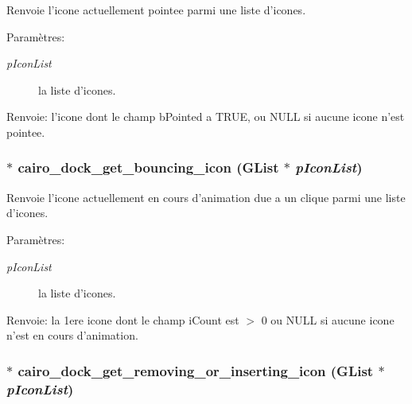 Renvoie l'icone actuellement pointee parmi une liste d'icones. \begin{Desc}
\item[Paramètres:]
\begin{description}
\item[{\em pIconList}]la liste d'icones. \end{description}
\end{Desc}
\begin{Desc}
\item[Renvoie:]l'icone dont le champ bPointed a TRUE, ou NULL si aucune icone n'est pointee. \end{Desc}
\subsubsection{$\ast$ cairo\_\-dock\_\-get\_\-bouncing\_\-icon (GList $\ast$ {\em pIconList})}\label{cairo-dock-icons_8h_532844978ed82d7672e33e81a3fcf6a4}


Renvoie l'icone actuellement en cours d'animation due a un clique parmi une liste d'icones. \begin{Desc}
\item[Paramètres:]
\begin{description}
\item[{\em pIconList}]la liste d'icones. \end{description}
\end{Desc}
\begin{Desc}
\item[Renvoie:]la 1ere icone dont le champ iCount est $>$ 0 ou NULL si aucune icone n'est en cours d'animation. \end{Desc}
\subsubsection{$\ast$ cairo\_\-dock\_\-get\_\-removing\_\-or\_\-inserting\_\-icon (GList $\ast$ {\em pIconList})}\label{cairo-dock-icons_8h_189d2744f7e2343c1ad465a3322bbd2e}


